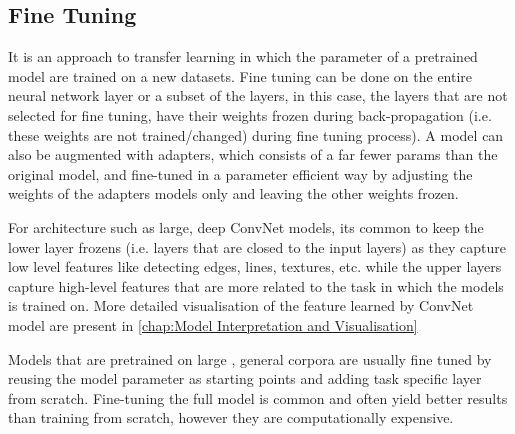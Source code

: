 \subsection{Fine Tuning}
It is an approach to transfer learning in which the parameter of a pretrained model are trained on  a new datasets\cite{ft}. Fine tuning can be done on the entire neural network layer or a subset of the layers, in this case, the layers that are not selected for fine tuning, have their weights frozen during back-propagation (i.e. these weights are not trained/changed) during fine tuning process). A model can also be augmented with adapters, which consists of a far fewer params than the original model, and fine-tuned in a parameter efficient way by adjusting the weights of the adapters models only and leaving the other weights frozen\cite{efficient-fine-tuning}. \par\vspace{1em}
For architecture such as large, deep ConvNet models, its common to keep the lower layer frozens (i.e. layers that are closed to the input layers) as they capture low level features like detecting edges, lines, textures, etc. while the upper layers capture high-level features that are more related to the task in which the models is trained on\cite{Visualizing-and-Understanding-Convolutional-Networks}. More detailed visualisation of the feature learned by ConvNet model are present in \autoref{chap:Model Interpretation and Visualisation}
\par\vspace{1em}
Models that are pretrained on large , general corpora are usually fine tuned by reusing the model parameter as starting points and adding task specific layer from scratch. Fine-tuning the full model is common and often yield better results than training from scratch, however they are computationally expensive.\cite{fine-tuned-pretrained-model-1}\cite{fine-tuned-pretrained-model-2} \par\vspace{1em}